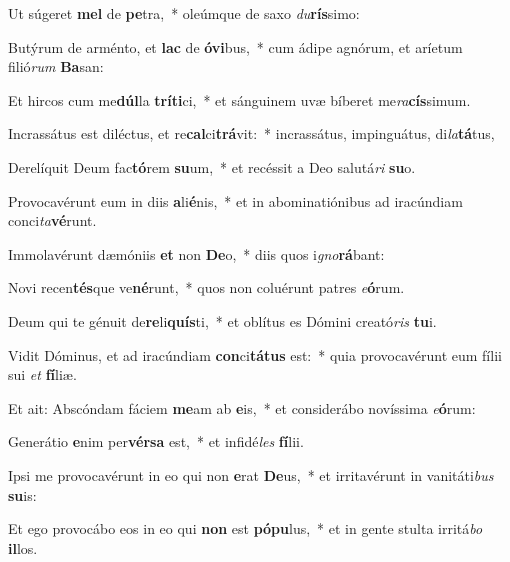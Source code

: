\item Ut súgeret \textbf{mel} de \textbf{pe}tra,~* oleúmque de saxo \textit{du}\textbf{rís}simo:
\item Butýrum de arménto, et \textbf{lac} de \textbf{ó}\textbf{vi}bus,~* cum ádipe agnórum, et aríetum filió\textit{rum} \textbf{Ba}san:
\item Et hircos cum me\textbf{dúl}la \textbf{trí}\textbf{ti}ci,~* et sánguinem uvæ bíberet me\textit{ra}\textbf{cís}simum.
\item Incrassátus est diléctus, et re\textbf{cal}ci\textbf{trá}vit:~* incrassátus, impinguátus, di\textit{la}\textbf{tá}tus,
\item Derelíquit Deum fac\textbf{tó}rem \textbf{su}um,~* et recéssit a Deo salutá\textit{ri} \textbf{su}o.
\item Provocavérunt eum in diis \textbf{a}li\textbf{é}nis,~* et in abominatiónibus ad iracúndiam conci\textit{ta}\textbf{vé}runt.
\item Immolavérunt dæmóniis \textbf{et} non \textbf{De}o,~* diis quos i\textit{gno}\textbf{rá}bant:
\item Novi recen\textbf{tés}que ve\textbf{né}runt,~* quos non coluérunt patres \textit{e}\textbf{ó}rum.
\item Deum qui te génuit de\textbf{re}li\textbf{quís}ti,~* et oblítus es Dómini creató\textit{ris} \textbf{tu}i.
\item Vidit Dóminus, et ad iracúndiam \textbf{con}ci\textbf{tá}\textbf{tus} est:~* quia provocavérunt eum fílii sui \textit{et} \textbf{fí}liæ.
\item Et ait: Abscóndam fáciem \textbf{me}am ab \textbf{e}is,~* et considerábo novíssima \textit{e}\textbf{ó}rum:
\item Generátio \textbf{e}nim per\textbf{vér}\textbf{sa} est,~* et infidé\textit{les} \textbf{fí}lii.
\item Ipsi me provocavérunt in eo qui non \textbf{e}rat \textbf{De}us,~* et irritavérunt in vanitáti\textit{bus} \textbf{su}is:
\item Et ego provocábo eos in eo qui \textbf{non} est \textbf{pó}\textbf{pu}lus,~* et in gente stulta irritá\textit{bo} \textbf{il}los.
